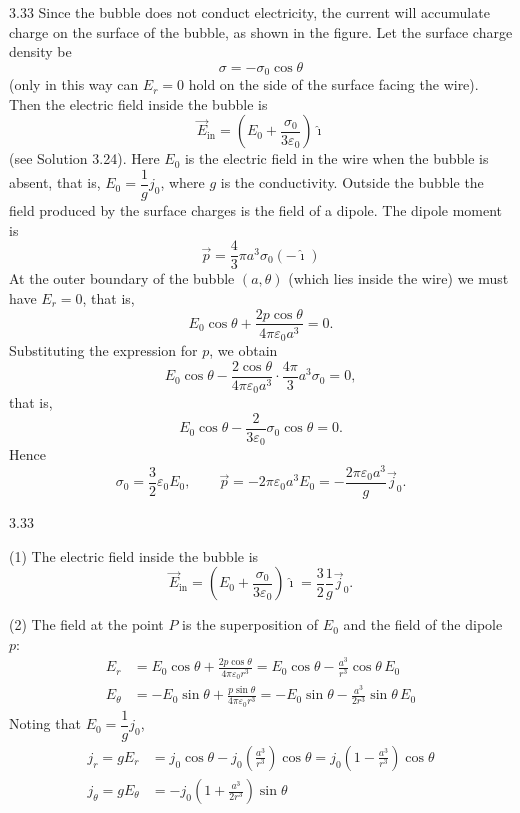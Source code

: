 \begin{solution}{3.33}
Since the bubble does not conduct electricity, the current will accumulate charge on the surface of the bubble, as shown in the figure. Let the surface charge density be
\[
\sigma=-\sigma_0\cos\theta
\]
(only in this way can $E_r=0$ hold on the side of the surface facing the wire). Then the electric field inside the bubble is
\[
\vec{E}_{\text{in}}=\left(E_0+\frac{\sigma_0}{3\varepsilon_0}\right)\hat{\imath}
\]
(see Solution 3.24). Here $E_0$ is the electric field in the wire when the bubble is absent, that is, $E_0=\dfrac{1}{g}j_0$, where $g$ is the conductivity. Outside the bubble the field produced by the surface charges is the field of a dipole. The dipole moment is
\[
\vec{p}=\frac{4}{3}\pi a^3\sigma_0(-\hat{\imath})
\]
At the outer boundary of the bubble $(a,\theta)$ (which lies inside the wire) we must have $E_r=0$, that is,
\[
E_0\cos\theta+\frac{2p\cos\theta}{4\pi\varepsilon_0a^3}=0.
\]
Substituting the expression for $p$, we obtain
\[
E_0\cos\theta-\frac{2\cos\theta}{4\pi\varepsilon_0a^3}\cdot\frac{4\pi}{3}a^3\sigma_0=0,
\]
that is,
\[
E_0\cos\theta-\frac{2}{3\varepsilon_0}\sigma_0\cos\theta=0.
\]
Hence
\[
\sigma_0=\frac{3}{2}\varepsilon_0E_0,\qquad
\vec{p}=-2\pi\varepsilon_0a^3E_0=-\frac{2\pi\varepsilon_0a^3}{g}\vec{j}_0 .
\]

\begin{figbox}{3.33}
\end{figbox}

(1) The electric field inside the bubble is
\[
\vec{E}_{\text{in}}=\left(E_0+\frac{\sigma_0}{3\varepsilon_0}\right)\hat{\imath}
=\frac{3}{2}\frac{1}{g}\vec{j}_0 .
\]

(2) The field at the point $P$ is the superposition of $E_0$ and the field of the dipole $p$:
\begin{align}
E_r &= E_0\cos\theta+\frac{2p\cos\theta}{4\pi\varepsilon_0r^3}
=E_0\cos\theta-\frac{a^3}{r^3}\cos\theta\,E_0\\
E_\theta &= -E_0\sin\theta+\frac{p\sin\theta}{4\pi\varepsilon_0r^3}
=-E_0\sin\theta-\frac{a^3}{2r^3}\sin\theta\,E_0
\end{align}
Noting that $E_0=\dfrac{1}{g}j_0$,
\begin{align}
j_r=gE_r &= j_0\cos\theta-j_0\left(\frac{a^3}{r^3}\right)\cos\theta
=j_0\left(1-\frac{a^3}{r^3}\right)\cos\theta\\
j_\theta=gE_\theta &= -j_0\left(1+\frac{a^3}{2r^3}\right)\sin\theta
\end{align}


\end{solution}

